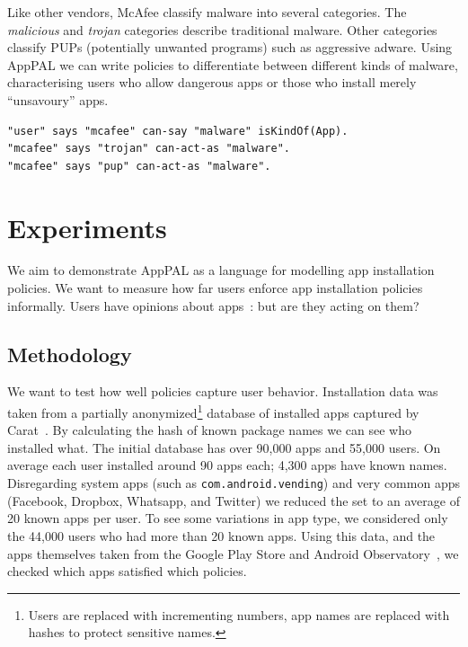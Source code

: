 \documentclass[]{soups-poster}
\newcommand{\citep}[1]{\cite{#1}}
\begin{document}
Like other vendors, McAfee classify malware into several categories.
The \emph{malicious} and \emph{trojan} categories describe traditional malware.
Other categories classify PUPs (potentially unwanted programs) such as aggressive adware.
Using AppPAL we can write policies to differentiate between different kinds of malware,
characterising users who allow dangerous apps or those who install merely ``unsavoury'' apps.
\begin{lstlisting}
"user" says "mcafee" can-say "malware" isKindOf(App).
"mcafee" says "trojan" can-act-as "malware".
"mcafee" says "pup" can-act-as "malware".
\end{lstlisting}

%

\section{Experiments}


We aim to demonstrate AppPAL as a language for modelling app installation policies.
We want to measure how far users enforce app installation policies informally.
Users have opinions about apps~\citep{Sadeh:2014vq}: but are they acting on them?

\subsection{Methodology}

We want to test how well policies capture user behavior.
Installation data was taken from a partially anonymized\footnote{Users are replaced with incrementing numbers, app names are replaced with hashes to protect sensitive names.} database of installed apps captured by Carat~\citep{Oliner:2013ht}.
By calculating the hash of known package names we can see who installed what.
%
The initial database has over 90,000 apps and 55,000 users.
On average each user installed around 90 apps each; 4,300 apps have known names.
Disregarding system apps (such as \texttt{com.android.vending}) and very common apps (Facebook, Dropbox, Whatsapp, and Twitter) we reduced the set to an average of 20 known apps per user.
To see some variations in app type, we considered only the 44,000 users who had more than 20 known apps.
Using this data, and the apps themselves taken from the Google Play Store and Android Observatory~\citep{Barrera:2012iba}, we checked which apps satisfied which policies.
\end{document}
